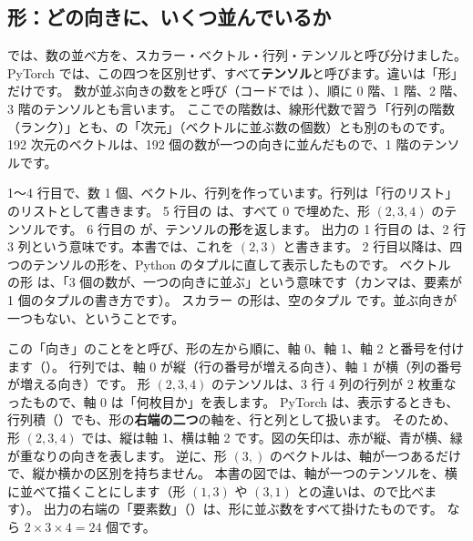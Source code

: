 \subsection*{形：どの向きに、いくつ並んでいるか}

では、数の並べ方を、スカラー・ベクトル・行列・テンソルと呼び分けました。
PyTorch では、この四つを区別せず、すべて\textbf{テンソル}と呼びます。違いは「形」だけです。
数が並ぶ向きの数をと呼び（コードでは ）、順に 0 階、1 階、2 階、3 階のテンソルとも言います。
ここでの階数は、線形代数で習う「行列の階数（ランク）」とも、の「次元」（ベクトルに並ぶ数の個数）とも別のものです。192 次元のベクトルは、192 個の数が一つの向きに並んだもので、1 階のテンソルです。



1〜4 行目で、数 1 個、ベクトル、行列を作っています。行列は「行のリスト」のリストとして書きます。
5 行目の  は、すべて 0 で埋めた、形 $(2,3,4)$ のテンソルです。
6 行目の  が、テンソルの\textbf{形}を返します。
出力の 1 行目の  は、2 行 3 列という意味です。本書では、これを $(2,3)$ と書きます。
2 行目以降は、四つのテンソルの形を、Python のタプルに直して表示したものです。
ベクトル  の形  は、「3 個の数が、一つの向きに並ぶ」という意味です（カンマは、要素が 1 個のタプルの書き方です）。
スカラー  の形は、空のタプル \code{()} です。並ぶ向きが一つもない、ということです。

この「向き」のことをと呼び、形の左から順に、軸 0、軸 1、軸 2 と番号を付けます（）。
行列では、軸 0 が縦（行の番号が増える向き）、軸 1 が横（列の番号が増える向き）です。
形 $(2,3,4)$ のテンソルは、3 行 4 列の行列が 2 枚重なったもので、軸 0 は「何枚目か」を表します。
PyTorch は、表示するときも、行列積（）でも、形の\textbf{右端の二つ}の軸を、行と列として扱います。
そのため、形 $(2,3,4)$ では、縦は軸 1、横は軸 2 です。図の矢印は、赤が縦、青が横、緑が重なりの向きを表します。
逆に、形 $(3,)$ のベクトルは、軸が一つあるだけで、縦か横かの区別を持ちません。
本書の図では、軸が一つのテンソルを、横に並べて描くことにします（形 $(1,3)$ や $(3,1)$ との違いは、ので比べます）。
出力の右端の「要素数」（）は、形に並ぶ数をすべて掛けたものです。 なら $2\times 3\times 4=24$ 個です。

